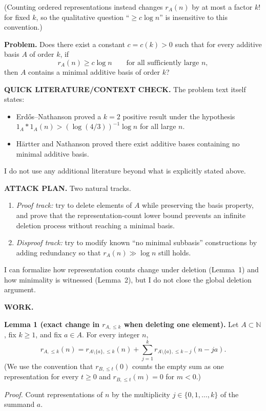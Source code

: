 (Counting ordered representations instead changes $r_A(n)$ by at most a factor $k!$ for fixed $k$, so the qualitative question ``$\ge c\log n$'' is insensitive to this convention.)

\medskip
\noindent\textbf{Problem.}
Does there exist a constant $c=c(k)>0$ such that for every additive basis $A$ of order $k$, if
\[
 r_A(n)\ge c\log n\qquad\text{for all sufficiently large }n,
\]
then $A$ contains a minimal additive basis of order $k$?

\medskip
\noindent\textbf{QUICK LITERATURE/CONTEXT CHECK.}
The problem text itself states:
\begin{itemize}
\item Erd\H{o}s--Nathanson proved a $k=2$ positive result under the hypothesis $1_A\ast 1_A(n)>(\log(4/3))^{-1}\log n$ for all large $n$.
\item H\"artter and Nathanson proved there exist additive bases containing no minimal additive basis.
\end{itemize}
I do not use any additional literature beyond what is explicitly stated above.

\medskip
\noindent\textbf{ATTACK PLAN.}
Two natural tracks.
\begin{enumerate}
\item \emph{Proof track:} try to delete elements of $A$ while preserving the basis property, and prove that the representation-count lower bound prevents an infinite deletion process without reaching a minimal basis.
\item \emph{Disproof track:} try to modify known ``no minimal subbasis'' constructions by adding redundancy so that $r_A(n)\gg\log n$ still holds.
\end{enumerate}
I can formalize how representation counts change under deletion (Lemma~1) and how minimality is witnessed (Lemma~2), but I do not close the global deletion argument.

\medskip
\noindent\textbf{WORK.}

\noindent\textbf{Lemma 1 (exact change in $r_{A,\le k}$ when deleting one element).}
Let $A\subset\mathbb N$, fix $k\ge 1$, and fix $a\in A$. For every integer $n$,
\[
 r_{A,\le k}(n)
 = r_{A\setminus\{a\},\le k}(n)
 + \sum_{j=1}^{k} r_{A\setminus\{a\},\le k-j}(n-ja).
\]
(We use the convention that $r_{B,\le t}(0)$ counts the empty sum as one representation for every $t\ge 0$ and $r_{B,\le t}(m)=0$ for $m<0$.)

\noindent\emph{Proof.}
Count representations of $n$ by the multiplicity $j\in\{0,1,\dots,k\}$ of the summand $a$.

